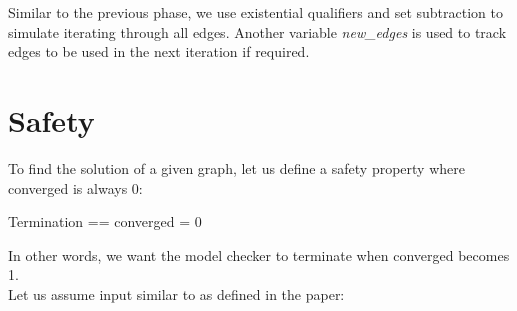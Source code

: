 Similar to the previous phase, we use existential qualifiers and set subtraction to
simulate iterating through all edges. Another variable \textit{new\_edges} is
used to track edges to be used in the next iteration if required. 

\section{Safety}

To find the solution of a given graph, let us define a safety property where
converged is always 0:\\

\begin{tla}
Termination == 
    converged = 0
\end{tla}
\begin{tlatex}
%
%
\end{tlatex}

In other words, we want the model checker to terminate when converged becomes 1.\\ 

Let us assume input similar to as defined in the paper:

